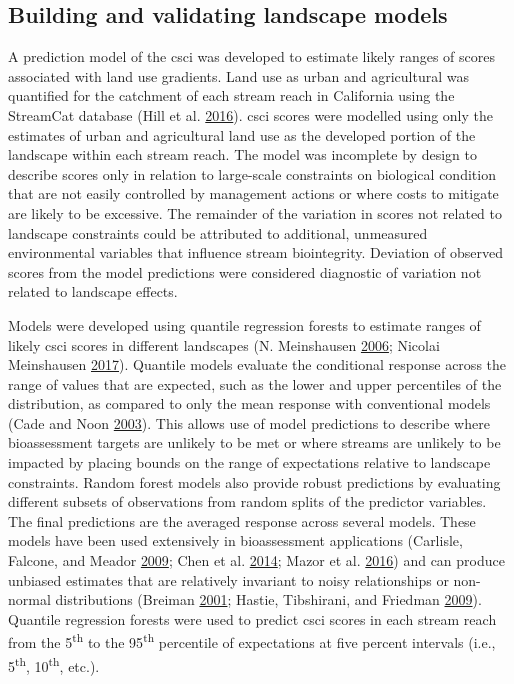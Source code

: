 \documentclass[]{article}
\begin{document}
\subsection{Building and validating landscape
models}\label{building-and-validating-landscape-models}

A prediction model of the \ac{csci} was developed to estimate likely
ranges of scores associated with land use gradients. Land use as urban
and agricultural was quantified for the catchment of each stream reach
in California using the StreamCat database (Hill et al.
\protect\hyperlink{ref-Hill16}{2016}). \ac{csci} scores were modelled
using only the estimates of urban and agricultural land use as the
developed portion of the landscape within each stream reach. The model
was incomplete by design to describe scores only in relation to
large-scale constraints on biological condition that are not easily
controlled by management actions or where costs to mitigate are likely
to be excessive. The remainder of the variation in scores not related to
landscape constraints could be attributed to additional, unmeasured
environmental variables that influence stream biointegrity. Deviation of
observed scores from the model predictions were considered diagnostic of
variation not related to landscape effects.

Models were developed using quantile regression forests to estimate
ranges of likely \ac{csci} scores in different landscapes (N.
Meinshausen \protect\hyperlink{ref-Meinshausen06}{2006}; Nicolai
Meinshausen \protect\hyperlink{ref-Meinshausen17}{2017}). Quantile
models evaluate the conditional response across the range of values that
are expected, such as the lower and upper percentiles of the
distribution, as compared to only the mean response with conventional
models (Cade and Noon \protect\hyperlink{ref-Cade03}{2003}). This allows
use of model predictions to describe where bioassessment targets are
unlikely to be met or where streams are unlikely to be impacted by
placing bounds on the range of expectations relative to landscape
constraints. Random forest models also provide robust predictions by
evaluating different subsets of observations from random splits of the
predictor variables. The final predictions are the averaged response
across several models. These models have been used extensively in
bioassessment applications (Carlisle, Falcone, and Meador
\protect\hyperlink{ref-Carlisle09}{2009}; Chen et al.
\protect\hyperlink{ref-Chen14}{2014}; Mazor et al.
\protect\hyperlink{ref-Mazor16}{2016}) and can produce unbiased
estimates that are relatively invariant to noisy relationships or
non-normal distributions (Breiman
\protect\hyperlink{ref-Breiman01}{2001}; Hastie, Tibshirani, and
Friedman \protect\hyperlink{ref-Hastie09}{2009}). Quantile regression
forests were used to predict \ac{csci} scores in each stream reach from
the 5\textsuperscript{th} to the 95\textsuperscript{th} percentile of
expectations at five percent intervals (i.e., 5\textsuperscript{th},
10\textsuperscript{th}, etc.).
\end{document}
